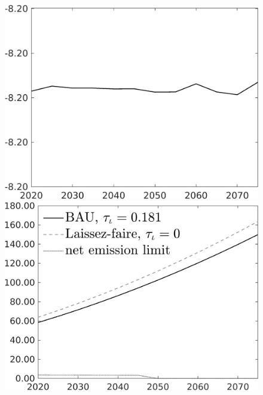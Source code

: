 \documentclass[12pt]{article}
\begin{document}
\begin{figure}[h!!]
\begin{minipage}[]{0.32\textwidth}
	\end{minipage}	
	\begin{minipage}[]{0.32\textwidth}
		\includegraphics[width=1\textwidth]{../../codding_model/own_basedOnFried/optimalPol_010922_revision/figures/all_13Sept22/CompTaul_LFBAUPer_Reg0_C_spillover0_nsk1_xgr0_knspil1_sep1_countec0_GovRev0_etaa0.79.png}
	\end{minipage}	
	\begin{minipage}[]{0.32\textwidth}
		\includegraphics[width=1\textwidth]{../../codding_model/own_basedOnFried/optimalPol_010922_revision/figures/all_13Sept22/CompTaul_LFBAU_Reg0_Emnet_spillover0_nsk1_xgr0_knspil1_sep1_countec0_GovRev0_etaa0.79_lgd1.png}

\end{minipage}
\end{figure}
\end{document}
